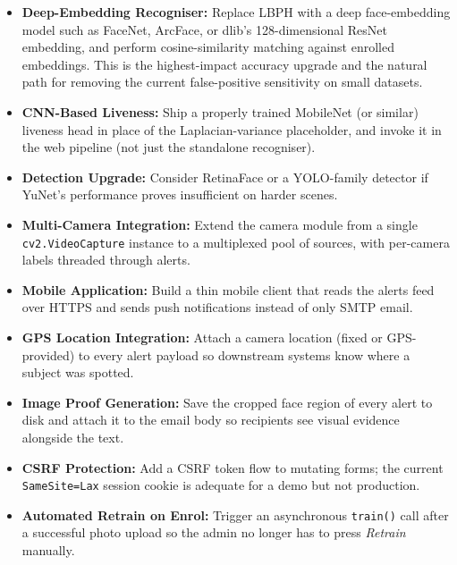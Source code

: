 \documentclass[11pt]{report}
\begin{document}
\begin{itemize}
    \item \textbf{Deep-Embedding Recogniser:} Replace LBPH with a deep face-embedding model such as FaceNet, ArcFace, or dlib's 128-dimensional ResNet embedding, and perform cosine-similarity matching against enrolled embeddings. This is the highest-impact accuracy upgrade and the natural path for removing the current false-positive sensitivity on small datasets.

    \item \textbf{CNN-Based Liveness:} Ship a properly trained MobileNet (or similar) liveness head in place of the Laplacian-variance placeholder, and invoke it in the web pipeline (not just the standalone recogniser).

    \item \textbf{Detection Upgrade:} Consider RetinaFace or a YOLO-family detector if YuNet's performance proves insufficient on harder scenes.

    \item \textbf{Multi-Camera Integration:} Extend the camera module from a single \texttt{cv2.VideoCapture} instance to a multiplexed pool of sources, with per-camera labels threaded through alerts.

    \item \textbf{Mobile Application:} Build a thin mobile client that reads the alerts feed over HTTPS and sends push notifications instead of only SMTP email.

    \item \textbf{GPS Location Integration:} Attach a camera location (fixed or GPS-provided) to every alert payload so downstream systems know where a subject was spotted.

    \item \textbf{Image Proof Generation:} Save the cropped face region of every alert to disk and attach it to the email body so recipients see visual evidence alongside the text.

    \item \textbf{CSRF Protection:} Add a CSRF token flow to mutating forms; the current \texttt{SameSite=Lax} session cookie is adequate for a demo but not production.

    \item \textbf{Automated Retrain on Enrol:} Trigger an asynchronous \texttt{train()} call after a successful photo upload so the admin no longer has to press \emph{Retrain} manually.
\end{itemize}
\end{document}
